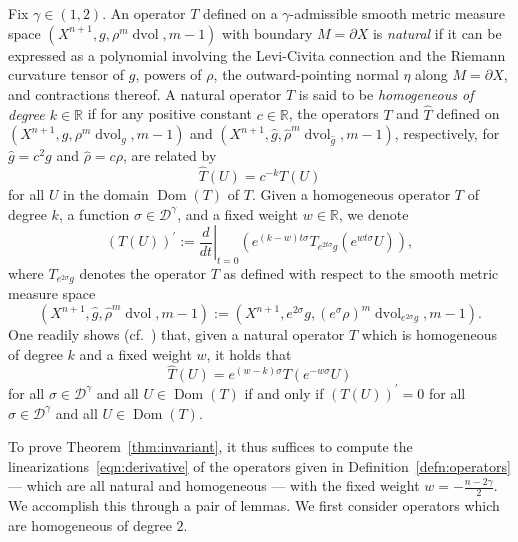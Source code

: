 \documentclass{amsart}
\theoremstyle{definition}
\theoremstyle{remark}
\numberwithin{equation}{section}
\begin{document}
Fix $\gamma\in(1,2)$.  An operator $T$ defined on a $\gamma$-admissible smooth metric measure space $(X^{n+1},g,\rho^m\operatorname{dvol},m-1)$ with boundary $M=\partial X$ is \emph{natural} if it can be expressed as a polynomial involving the Levi-Civita connection and the Riemann curvature tensor of $g$, powers of $\rho$, the outward-pointing normal $\eta$ along $M=\partial X$, and contractions thereof.  A natural operator $T$ is said to be \emph{homogeneous of degree $k\in{\mathbb{R}}$} if for any positive constant $c\in{\mathbb{R}}$, the operators $T$ and $\hat T$ defined on $(X^{n+1},g,\rho^m\operatorname{dvol}_g,m-1)$ and $(X^{n+1},{\widehat{g}},{\widehat{\rho}}^m\operatorname{dvol}_{\widehat{g}},m-1)$, respectively, for ${\widehat{g}}=c^2g$ and ${\widehat{\rho}}=c\rho$, are related by
\[ {\widehat{T}}(U) = c^{-k} T(U) \]
for all $U$ in the domain $\operatorname{Dom}(T)$ of $T$.  Given a homogeneous operator $T$ of degree $k$, a function $\sigma\in{\mathcal{D}}^\gamma$, and a fixed weight $w\in{\mathbb{R}}$, we denote
\begin{equation}
\label{eqn:derivative}
\left(T(U)\right)^\prime := \left.\frac{d}{dt}\right|_{t=0}\left( e^{(k-w)t\sigma}T_{e^{2t\sigma}g}\left(e^{wt\sigma}U\right)\right) ,
\end{equation}
where $T_{e^{2\sigma}g}$ denotes the operator $T$ as defined with respect to the smooth metric measure space
\[ \left(X^{n+1},{\widehat{g}},{\widehat{\rho}}^m\operatorname{dvol},m-1\right) := \left(X^{n+1},e^{2\sigma}g,(e^\sigma\rho)^m\operatorname{dvol}_{e^{2\sigma}g},m-1\right) . \]
One readily shows (cf.\ \cite[Corollary~1.14]{Branson1985}) that, given a natural operator $T$ which is homogeneous of degree $k$ and a fixed weight $w$, it holds that
\[ {\widehat{T}}(U) = e^{(w-k)\sigma}T\left(e^{-w\sigma}U\right) \]
for all $\sigma\in{\mathcal{D}}^\gamma$ and all $U\in\operatorname{Dom}(T)$ if and only if $\left(T(U)\right)^\prime=0$ for all $\sigma\in{\mathcal{D}}^\gamma$ and all $U\in\operatorname{Dom}(T)$.

To prove Theorem~\ref{thm:invariant}, it thus suffices to compute the linearizations~\eqref{eqn:derivative} of the operators given in Definition~\ref{defn:operators} --- which are all natural and homogeneous --- with the fixed weight $w=-\frac{n-2\gamma}{2}$.  We accomplish this through a pair of lemmas.  We first consider operators which are homogeneous of degree $2$.
\end{document}
